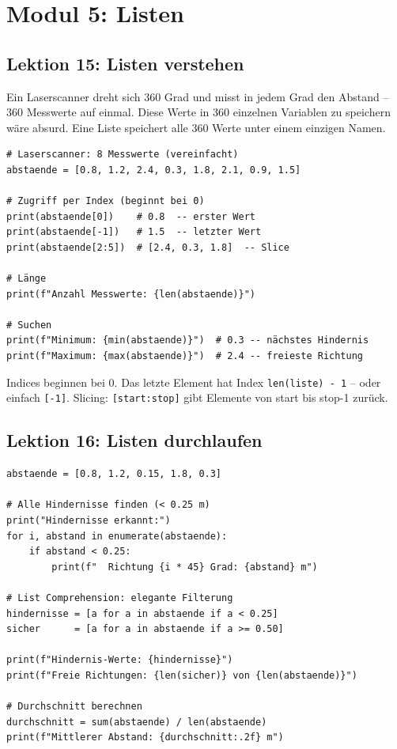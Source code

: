 \chapter{Modul 5: Listen}

\section{Lektion 15: Listen verstehen}

\begin{analogie}
Ein Laserscanner dreht sich 360 Grad und misst in jedem Grad den Abstand -- 360 Messwerte auf einmal. Diese Werte in 360 einzelnen Variablen zu speichern wäre absurd. Eine Liste speichert alle 360 Werte unter einem einzigen Namen.
\end{analogie}

\begin{lstlisting}
# Laserscanner: 8 Messwerte (vereinfacht)
abstaende = [0.8, 1.2, 2.4, 0.3, 1.8, 2.1, 0.9, 1.5]

# Zugriff per Index (beginnt bei 0)
print(abstaende[0])    # 0.8  -- erster Wert
print(abstaende[-1])   # 1.5  -- letzter Wert
print(abstaende[2:5])  # [2.4, 0.3, 1.8]  -- Slice

# Länge
print(f"Anzahl Messwerte: {len(abstaende)}")

# Suchen
print(f"Minimum: {min(abstaende)}")  # 0.3 -- nächstes Hindernis
print(f"Maximum: {max(abstaende)}")  # 2.4 -- freieste Richtung
\end{lstlisting}

\begin{merksatz}
Indices beginnen bei 0. Das letzte Element hat Index \texttt{len(liste) - 1} -- oder einfach \texttt{[-1]}. Slicing: \texttt{[start:stop]} gibt Elemente von start bis stop-1 zurück.
\end{merksatz}

\section{Lektion 16: Listen durchlaufen}

\begin{lstlisting}
abstaende = [0.8, 1.2, 0.15, 1.8, 0.3]

# Alle Hindernisse finden (< 0.25 m)
print("Hindernisse erkannt:")
for i, abstand in enumerate(abstaende):
    if abstand < 0.25:
        print(f"  Richtung {i * 45} Grad: {abstand} m")

# List Comprehension: elegante Filterung
hindernisse = [a for a in abstaende if a < 0.25]
sicher      = [a for a in abstaende if a >= 0.50]

print(f"Hindernis-Werte: {hindernisse}")
print(f"Freie Richtungen: {len(sicher)} von {len(abstaende)}")

# Durchschnitt berechnen
durchschnitt = sum(abstaende) / len(abstaende)
print(f"Mittlerer Abstand: {durchschnitt:.2f} m")
\end{lstlisting}

